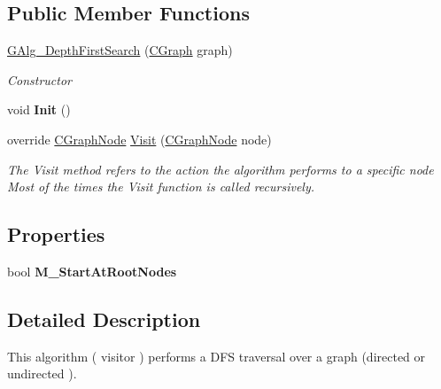 \subsection*{Public Member Functions}
\begin{DoxyCompactItemize}
\item 
\hyperlink{class_graph_library_1_1_g_alg___depth_first_search_a4bb5db62c1c4a75d9c204ead9a254c06}{G\+Alg\+\_\+\+Depth\+First\+Search} (\hyperlink{class_graph_library_1_1_c_graph}{C\+Graph} graph)
\begin{DoxyCompactList}\small\item\em Constructor \end{DoxyCompactList}\item 
\hypertarget{class_graph_library_1_1_g_alg___depth_first_search_acb806ff284125eece9f558af21ea4a86}{}void {\bfseries Init} ()\label{class_graph_library_1_1_g_alg___depth_first_search_acb806ff284125eece9f558af21ea4a86}

\item 
override \hyperlink{class_graph_library_1_1_c_graph_node}{C\+Graph\+Node} \hyperlink{class_graph_library_1_1_g_alg___depth_first_search_a25029f53be2b8c588c248f4bb165618d}{Visit} (\hyperlink{class_graph_library_1_1_c_graph_node}{C\+Graph\+Node} node)
\begin{DoxyCompactList}\small\item\em The Visit method refers to the action the algorithm performs to a specific node Most of the times the Visit function is called recursively. \end{DoxyCompactList}\end{DoxyCompactItemize}
\subsection*{Properties}
\begin{DoxyCompactItemize}
\item 
\hypertarget{class_graph_library_1_1_g_alg___depth_first_search_af8a276814fe95f97c0778d1254a25efb}{}bool {\bfseries M\+\_\+\+Start\+At\+Root\+Nodes}\label{class_graph_library_1_1_g_alg___depth_first_search_af8a276814fe95f97c0778d1254a25efb}

\end{DoxyCompactItemize}


\subsection{Detailed Description}
This algorithm ( visitor ) performs a D\+F\+S traversal over a graph (directed or undirected ). 



